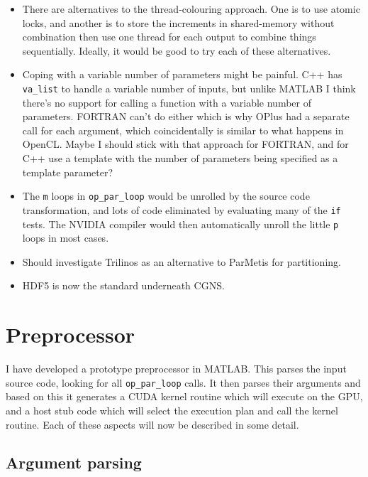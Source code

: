 \documentclass[12pt]{article}
\begin{document}
\begin{itemize}
\item
There are alternatives to the thread-colouring approach.  One is to use 
atomic locks, and another is to store the increments in shared-memory 
without combination then use one thread for each output to combine things
sequentially.  Ideally, it would be good to try each of these alternatives.

\item
Coping with a variable number of parameters might be painful.  C++ has 
{\tt va\_list} to handle a variable number of inputs, but unlike MATLAB 
I think there's no support for calling a function with a variable number 
of parameters.  FORTRAN can't do either which is why OPlus had a separate 
call for each argument, which coincidentally is similar to what happens in 
OpenCL.  Maybe I should stick with that approach for FORTRAN, and for C++ 
use a template with the number of parameters being specified as a template 
parameter?

\item
The {\tt m} loops in {\tt op\_par\_loop} would be unrolled by the source code 
transformation, and lots of code eliminated by evaluating many of the {\tt if} 
tests.  The NVIDIA compiler would then automatically unroll the little 
{\tt p} loops in most cases.


\item
Should investigate Trilinos as an alternative to ParMetis for partitioning.

\item
HDF5 is now the standard underneath CGNS.

\end{itemize}


\newpage

\section{Preprocessor}

I have developed a prototype preprocessor in MATLAB.  This parses 
the input source code, looking for all {\tt op\_par\_loop} calls.
It then parses their arguments and based on this it generates a CUDA
kernel routine which will execute on the GPU, and a host stub code 
which will select the execution plan and call the kernel routine.
Each of these aspects will now be described in some detail.

\subsection{Argument parsing}
\end{document}
